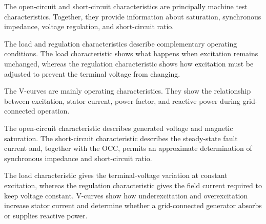 The open-circuit and short-circuit characteristics are principally machine
test characteristics. Together, they provide information about saturation,
synchronous impedance, voltage regulation, and short-circuit ratio.

The load and regulation characteristics describe complementary operating
conditions. The load characteristic shows what happens when excitation remains
unchanged, whereas the regulation characteristic shows how excitation must be
adjusted to prevent the terminal voltage from changing.

The V-curves are mainly operating characteristics. They show the relationship
between excitation, stator current, power factor, and reactive power during
grid-connected operation.

\begin{chaptersummary}
The open-circuit characteristic describes generated voltage and magnetic
saturation. The short-circuit characteristic describes the steady-state fault
current and, together with the OCC, permits an approximate determination of
synchronous impedance and short-circuit ratio.

The load characteristic gives the terminal-voltage variation at constant
excitation, whereas the regulation characteristic gives the field current
required to keep voltage constant. V-curves show how underexcitation and
overexcitation increase stator current and determine whether a grid-connected
generator absorbs or supplies reactive power.
\end{chaptersummary}
